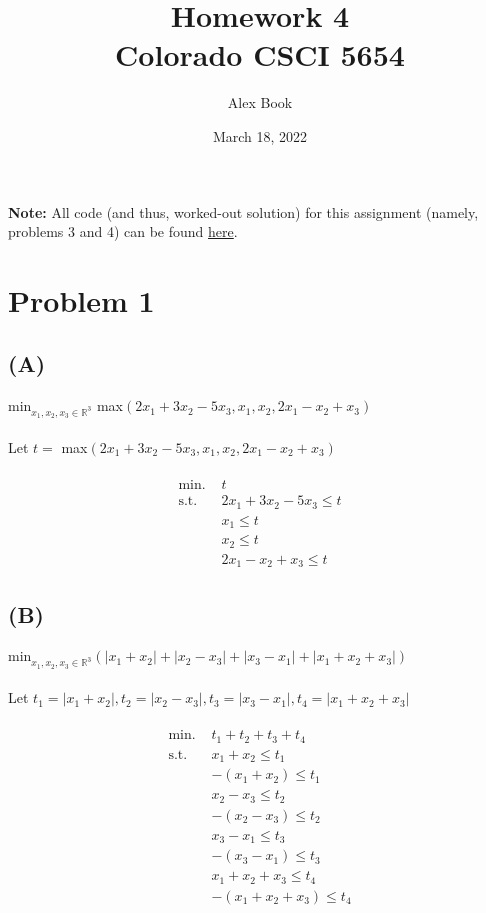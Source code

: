 \documentclass[12pt]{article}
\begin{document}
\title{Homework 4 \\
       Colorado CSCI 5654}
\author{Alex Book}
\date{March 18, 2022}
\maketitle


\textbf{Note:} All code (and thus, worked-out solution) for this assignment (namely, problems 3 and 4) can be found \href{https://github.com/alexbook00/CSCI-5654/tree/main/Homework/HW4}{here}.

\section*{Problem 1}
\subsection*{(A)}
min$_{x_1, x_2, x_3 \in \mathbb{R}^3}$ max$(2x_1+3x_2-5x_3, x_1, x_2, 2x_1 - x_2 + x_3)$ \\
\\
Let $t=$ max$(2x_1+3x_2-5x_3, x_1, x_2, 2x_1 - x_2 + x_3)$ \\
\\
\begin{align*}
    \text{min. } & t \\
    \text{s.t. } & 2x_1 + 3x_2 - 5x_3 \leq t \\
    & x_1 \leq t \\
    & x_2 \leq t \\
    & 2x_1 - x_2 + x_3 \leq t
\end{align*}

\newpage
\subsection*{(B)}
min$_{x_1, x_2, x_3 \in \mathbb{R}^3} (|x_1+x_2| + |x_2 - x_3| + |x_3 - x_1| + |x_1 + x_2 + x_3|)$ \\
\\
Let $t_1=|x_1+x_2|, t_2=|x_2 - x_3|, t_3=|x_3 - x_1|, t_4=|x_1 + x_2 + x_3|$ \\
\\
\begin{align*}
    \text{min. } & t_1 + t_2 + t_3 + t_4 \\
    \text{s.t. } & x_1 + x_2 \leq t_1 \\
    & -(x_1 + x_2) \leq t_1 \\
    & x_2 - x_3 \leq t_2 \\
    & -(x_2 - x_3) \leq t_2 \\
    & x_3 - x_1 \leq t_3 \\
    & -(x_3 - x_1) \leq t_3 \\
    & x_1 + x_2 + x_3 \leq t_4 \\
    & -(x_1 + x_2 + x_3) \leq t_4
\end{align*}
\end{document}
